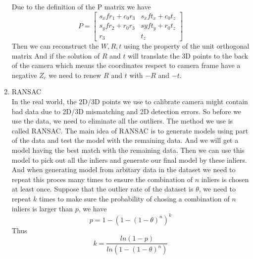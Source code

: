 \documentclass{article}
\begin{document}
\begin{enumerate}
Due to the definition of the P matrix we have
\begin{equation}
P=\begin{bmatrix}s_xfr_1+c_0r_3&s_xft_x+c_0t_z\\s_yfr_2+r_0r_3&syft_y+r_0t_z\\r_3&t_z\end{bmatrix}
\end{equation}
Then we can reconstruct the $W,R,t$ using the property of the unit orthogonal matrix
And if the solution of $R$ and $t$ will translate the 3D points to the back of the camera which means the coordinates respect to camera frame have a negative $Z_c$ we need to renew $R$ and $t$ with $-R$ and $-t$.
\item RANSAC\\

In the real world, the 2D/3D points we use to calibrate camera might contain bad data due to 2D/3D mismatching and 2D detection errors. So before we use the data, we need to eliminate all the outliers. The method we use is called RANSAC. The main idea of RANSAC is to generate models using part of the data and test the model with the remaining data. And we will get a model having the best match with the remaining data. Then we can use this model to pick out all the inliers and generate our final model by these inliers.\cite{ref2}
And when generating model from arbitary data in the dataset we need to repeat this proces many times to ensure the combination of $n$ inliers is chosen at least once. Suppose that the outlier rate of the dataset is $\theta$, we need to repeat $k$ times to make sure the probability of chosing a combination of $n$ inliers is larger than $p$, we have\cite{ref1}
\begin{equation}
p=1-(1-(1-\theta)^n)^k
\end{equation} 
Thus
\begin{equation}
k=\frac{ln(1-p)}{ln(1-(1-\theta)^n)}
\end{equation} 
\end{enumerate}%
\end{document}
